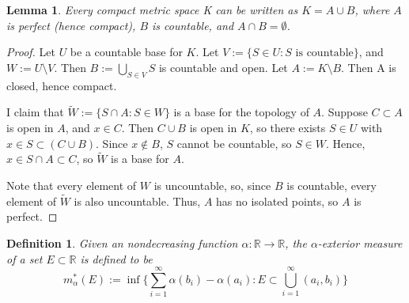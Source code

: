 \documentclass{article}
\newtheorem{definition}{Definition}
\newtheorem{lemma}{Lemma}
\newcommand{\m}{m^*_\alpha}
\begin{document}
\begin{lemma}\label{split}
Every compact metric space K can be written as 
$K = A \cup B$, where $A$ is perfect (hence compact), $B$ is countable, and $A \cap B = \emptyset$.
\end{lemma}
\begin{proof}
Let $U$ be a countable base for $K$. Let $V := \{S \in U : S \text{ is countable}\}$, and $W := U \setminus V$. Then $B:= \bigcup_{S\in V}{S}$ is countable and open.
Let $A:= K\setminus B$. Then A is closed, hence compact. 

I claim that $\widetilde{W} := \{S \cap A : S \in W\}$ is a base for the topology of $A$.  Suppose $C \subset A$ is open in $A$, and $x \in C$. Then $C \cup B$ is open in $K$, so there exists $S \in U$ with $x \in S \subset (C \cup B)$. Since $x \notin B$, $S$ cannot be countable, so $S \in W$. Hence, $x \in S \cap A \subset C$, so $\widetilde{W}$ is a base for $A$.

Note that every element of $W$ is uncountable, so, since $B$ is countable, every element of $\widetilde{W}$ is also uncountable. Thus, $A$ has no isolated points, so $A$ is perfect.
\end{proof}

\begin{definition}
Given an nondecreasing function $\alpha:\mathbb{R} \rightarrow \mathbb{R}$, the \emph{$\alpha$-exterior measure} of a set $E \subset \mathbb{R}$ is defined to be
$$\m(E) := \inf\{\sum_{i=1}^\infty {\alpha(b_i) - \alpha(a_i)}: E \subset \bigcup_{i=1}^\infty {(a_i,b_i)} \}$$
\end{definition}
\end{document}
